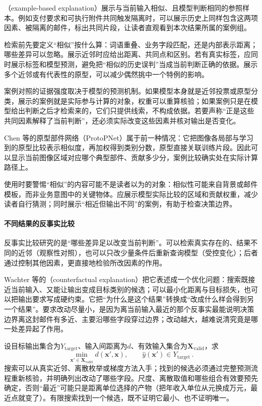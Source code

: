 （example-based explanation）展示与当前输入相似、且模型判断相同的参照样本。例如支付要求和可执行附件共同触发隔离时，可以展示历史上同样包含这两项因素、被隔离的邮件，标出共同片段，让读者直观看到本次结果所属的案例组。

检索前先要定义“相似”按什么算：词语重叠、业务字段匹配，还是内部表示距离；哪些差异可以忽略。展示近邻时应给出距离、共同点和区别。若有真实标签，应同时展示标签和模型预测，避免把“相似的历史误判”当成当前判断正确的依据。展示多个近邻或有代表性的原型，可以减少偶然挑中一个特例的影响。

案例对照的证据强度取决于模型的预测机制。如果模型本身就是近邻投票或原型分类，展示的案例就是实际参与计算的对象，权重可以重算核验；如果案例只是在模型给出判断之后才检索来的，它们只提供线索，不构成依据。若要声称“正是这些共同因素解释了当前判断”，还必须实际改变这些因素并核对输出是否变化。

Chen 等的原型部件网络（ProtoPNet）属于前一种情况：它把图像各局部与学习到的原型比较表示相似度，再加权得到类别分数，原型直接关联训练片段。因此可以显示当前图像区域对应哪个典型部件、贡献多少分，案例比较确实处在实际计算路径上。

使用时要警惕“相似”的内容可能不是读者以为的对象：相似性可能来自背景或邮件模板，而非业务意图中的关键物体。应展示模型实际比较的区域和贡献权重，减少读者自行猜测；同时展示“相近但输出不同”的案例，有助于检查决策边界。

\paragraph{不同结果的反事实比较}
\label{sec:interpretability-local-counterfactual}

反事实比较研究的是“哪些差异足以改变当前判断”。可以检索真实存在的、结果不同的近邻（观察性对照），也可以只改少量条件后重新查询模型（受控变化）；后者通过控制其他因素，更直接地检验所改因素的作用。

Wachter 等的（counterfactual explanation）把它表述成一个优化问题：搜索既接近当前输入、又能让输出变成目标类别的候选；可以最小化距离与目标损失，也可以把输出要求写成硬约束。它把“为什么是这个结果”转换成“改成什么样会得到另一个结果”。要求改动尽量小，是因为离当前输入最近的那个反事实最能说明决策边界离这封邮件有多近、主要沿哪些字段穿过边界；改动越大，越难说清究竟是哪一处差异起了作用。

设目标输出集合为$Y_{\mathrm{target}}$、输入间距离为$d$、有效输入集合为$\bm X_{\mathrm{valid}}$，求
\begin{equation}
 \min_{\bm{x}'\in\bm X_{\mathrm{valid}}}
 d(\bm{x}',\bm{x}),
 \qquad \hat y(\bm{x}')\in Y_{\mathrm{target}}\, .
 \label{eq:interpretability-counterfactual}
\end{equation}
搜索可以从真实近邻、离散枚举或梯度方法入手；找到的候选必须通过完整预测流程重新核验，并明确列出改动了哪些字段。尺度、离散取值和哪些组合有效要预先确定，否则“最近”可能只是距离单位选择的产物（把年收入单位从元换成万元，最近点就变了）。有限搜索找到一个候选，既不证明它最小、也不证明唯一。

